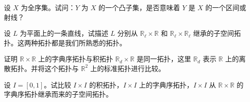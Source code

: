 \documentclass[../../main.tex]{subfiles}
\begin{document}
\begin{exercise}\label{exercise:ch02-子空间拓扑-7}
设 $X$ 为全序集。试问：$Y$ 为 $X$ 的一个凸子集，是否意味着 $Y$ 是 $X$ 的一个区间或射线？
\end{exercise}

\begin{exercise}\label{exercise:ch02-子空间拓扑-8}
设 $L$ 为平面上的一条直线，试描述 $L$ 分别从 $\mathbb{R}_{\ell} \times \mathbb{R}$ 和 $\mathbb{R}_{\ell} \times \mathbb{R}_{\ell}$ 继承的子空间拓扑。这两种拓扑都是我们所熟悉的拓扑。
\end{exercise}

\begin{exercise}\label{exercise:ch02-子空间拓扑-9}
证明 $\mathbb{R} \times \mathbb{R}$ 上的字典序拓扑与积拓扑 $\mathbb{R}_{d} \times \mathbb{R}$ 是同一拓扑，这里 $\mathbb{R}_{d}$ 表示 $\mathbb{R}$ 上的离散拓扑。并将这个拓扑与 $\mathbb{R}^{2}$ 上的标准拓扑进行比较。
\end{exercise}

\begin{exercise}\label{exercise:ch02-子空间拓扑-10}
设 $I = [0, 1]$。试比较 $I \times I$ 的积拓扑，$I \times I$ 上的字典序拓扑，$I \times I$ 从 $\mathbb{R} \times \mathbb{R}$ 的字典序拓扑继承而来的子空间拓扑。
\end{exercise}
\end{document}
